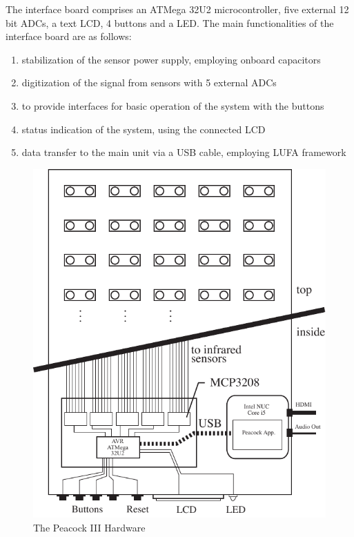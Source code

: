 \documentclass{nime-alternate}
\begin{document}
The interface board comprises an ATMega 32U2 microcontroller\cite{atmel:avr}, five external 12 bit ADCs, a text LCD, 4 buttons and a LED. The main functionalities of the interface board are as follows:

\begin{enumerate}
       \item stabilization of the sensor power supply, employing onboard capacitors
       \item digitization of the signal from sensors with 5 external ADCs
       \item to provide interfaces for basic operation of the system with the buttons
       \item status indication of the system, using the connected LCD
       \item data transfer to the main unit via a USB cable, employing LUFA framework
\end{enumerate}

\begin{figure}[htbp]
       \begin{center}
              \includegraphics[width=1\columnwidth]{Peacock_hardware.pdf}
       \end{center}
       \caption{The Peacock III Hardware}
       \label{fig:peacock}
\end{figure}
\end{document}
